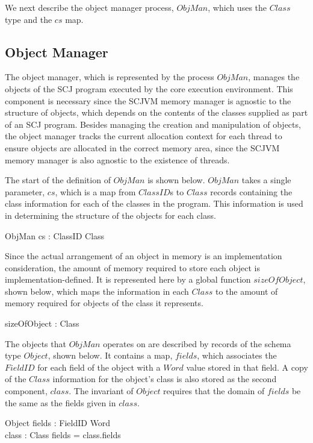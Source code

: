 We next describe the object manager process, $ObjMan$, which uses the
$Class$ type and the $cs$ map.

\subsection{Object Manager}
\label{cee-object-manager-subsection}

The object manager, which is represented by the process $ObjMan$,
manages the objects of the SCJ program executed by the core execution
environment.
This component is necessary since the SCJVM memory manager is agnostic
to the structure of objects, which depends on the contents of the
classes supplied as part of an SCJ program.
Besides managing the creation and manipulation of objects, the object
manager tracks the current allocation context for each thread to
ensure objects are allocated in the correct memory area, since the
SCJVM memory manager is also agnostic to the existence of threads.

The start of the definition of $ObjMan$ is shown below.
$ObjMan$ takes a single parameter, $cs$, which is a map from
$ClassID$s to $Class$ records containing the class information for
each of the classes in the program.
This information is used in determining the structure of the objects
for each class.
\begin{circus}
  \circprocess ObjMan \circdef cs : ClassID \pfun Class \circspot \circbegin
\end{circus}

Since the actual arrangement of an object in memory is an
implementation consideration, the amount of memory required to store
each object is implementation-defined.
It is represented here by a global function $sizeOfObject$, shown
below, which maps the information in each $Class$ to the amount of
memory required for objects of the class it represents.
\begin{axdef}
  sizeOfObject : Class \fun \nat
\end{axdef}

The objects that $ObjMan$ operates on are described by records of the
schema type $Object$, shown below.
It contains a map, $fields$, which associates the $FieldID$ for each
field of the object with a $Word$ value stored in that field.
A copy of the $Class$ information for the object's class is also
stored as the second component, $class$.
The invariant of $Object$ requires that the domain of $fields$ be the
same as the fields given in $class$.
\begin{schema}{Object}
  fields : FieldID \pfun Word \\
  class : Class
\where
  \dom fields = class.fields
\end{schema}      

